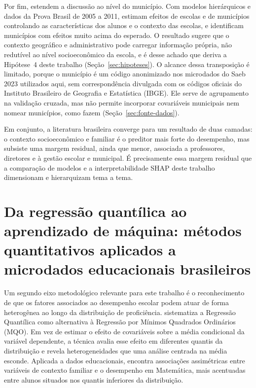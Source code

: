 Por fim,  estendem a discussão ao nível do
município. Com modelos hierárquicos e dados da Prova Brasil de 2005 a 2011,
estimam efeitos de escolas e de municípios controlando as características
dos alunos e o contexto das escolas, e identificam municípios com efeitos
muito acima do esperado. O resultado sugere que o contexto geográfico e
administrativo pode carregar informação própria, não redutível ao nível
socioeconômico da escola, e é desse achado que deriva a Hipótese~4 deste
trabalho (Seção~\ref{sec:hipoteses}). O alcance dessa transposição é
limitado, porque o município é um código anonimizado nos microdados do
Saeb 2023 utilizados aqui, sem correspondência divulgada com os códigos
oficiais do Instituto Brasileiro de Geografia e Estatística (IBGE). Ele
serve de agrupamento na validação cruzada, mas não permite incorporar
covariáveis municipais nem nomear municípios, como fazem
 (Seção~\ref{sec:fonte-dados}).

Em conjunto, a literatura brasileira converge para um resultado de duas
camadas: o contexto socioeconômico e familiar é o preditor mais forte do
desempenho, mas subsiste uma margem residual, ainda que menor, associada a
professores, diretores e à gestão escolar e municipal. É precisamente essa
margem residual que a comparação de modelos e a interpretabilidade SHAP
deste trabalho dimensionam e hierarquizam tema a tema.

\section{Da regressão quantílica ao aprendizado de máquina: métodos quantitativos aplicados a microdados educacionais brasileiros}
\label{sec:quantilica-ml}

Um segundo eixo metodológico relevante para este trabalho é o
reconhecimento de que os fatores associados ao desempenho escolar podem
atuar de forma heterogênea ao longo da distribuição de proficiência.
 sistematiza a Regressão Quantílica como
alternativa à Regressão por Mínimos Quadrados Ordinários (MQO). Em vez de
estimar o efeito de covariáveis sobre a média condicional da variável
dependente, a técnica avalia esse efeito em diferentes quantis da
distribuição e revela heterogeneidades que uma análise centrada na média
esconde. Aplicada a dados educacionais, 
encontra associações assimétricas entre variáveis de contexto familiar e o
desempenho em Matemática, mais acentuadas entre alunos situados nos
quantis inferiores da distribuição.


